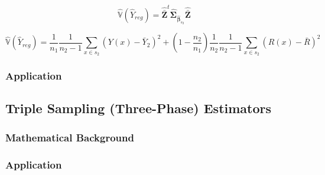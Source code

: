 \documentclass[article]{jss}
\newcommand{\var}{\mathbb{V}}
\begin{document}
\begin{equation}\label{eq:gw_var_simple}
\hat{\var}(\hat{Y}_{reg})=\hat{\bar{\pmb{Z}}}^t\hat{\pmb{\Sigma}}_{\hat{\pmb{\beta}}_{s_2}}\hat{\bar{\pmb{Z}}}
\end{equation}


\begin{equation}\label{eq:varexternalsimple}
\hat{\var}(\hat{Y}_{reg})=
\frac{1}{n_1}\frac{1}{n_2-1}\sum_{x\in{s_2}}(Y(x)-\bar{Y}_2)^2+
(1-\frac{n_2}{n_1})\frac{1}{n_2}\frac{1}{n_2-1}\sum_{x\in{s_2}}(R(x)-\bar{R})^2
\end{equation}




\subsubsection{Application}





















\subsection{Triple Sampling (Three-Phase) Estimators}


\subsubsection{Mathematical Background}

\subsubsection{Application}
\end{document}
